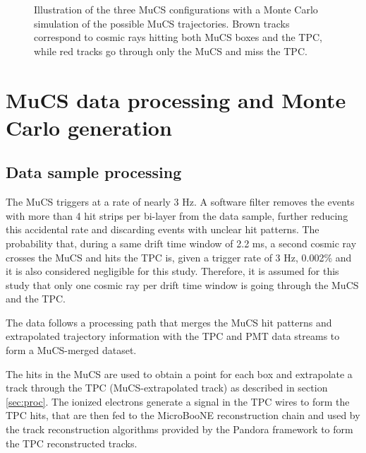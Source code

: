 \documentclass[a4paper,11pt]{article}
\begin{document}
\begin{figure}[htbp]
  \caption{Illustration of the three MuCS configurations with a Monte Carlo simulation of the possible MuCS trajectories. Brown tracks correspond to cosmic rays hitting both MuCS boxes and the TPC, while red tracks go through only the MuCS and miss the TPC.} \label{fig:mucs}
\end{figure}


\section{MuCS data processing and Monte Carlo generation}\label{sec:merging}

\subsection{Data sample processing}\label{sec:data_proc}
The MuCS triggers at a rate of nearly 3 Hz. 
A software filter removes the events with more than 4 hit strips per bi-layer from the data sample, further reducing this accidental rate and discarding events with unclear hit patterns.
The probability that, during a same drift time window of 2.2 ms, a second cosmic ray crosses the MuCS and hits the TPC is, given a trigger rate of 3 Hz, 0.002\% and it is also considered negligible for this study. Therefore, it is assumed for this study that only one cosmic ray per drift time window is going through the MuCS and the TPC.

The data follows a processing path that merges the MuCS hit patterns and extrapolated trajectory information with the TPC and PMT data streams to form a MuCS-merged dataset. %


The hits in the MuCS are used to obtain a point for each box and extrapolate a track through the TPC (MuCS-extrapolated track) as described in section \ref{sec:proc}. The ionized electrons generate a signal in the TPC wires to form the TPC hits, that are then fed to the MicroBooNE reconstruction chain and used by the track reconstruction algorithms provided by the Pandora framework \cite{pandora} to form the TPC reconstructed tracks.
\end{document}
